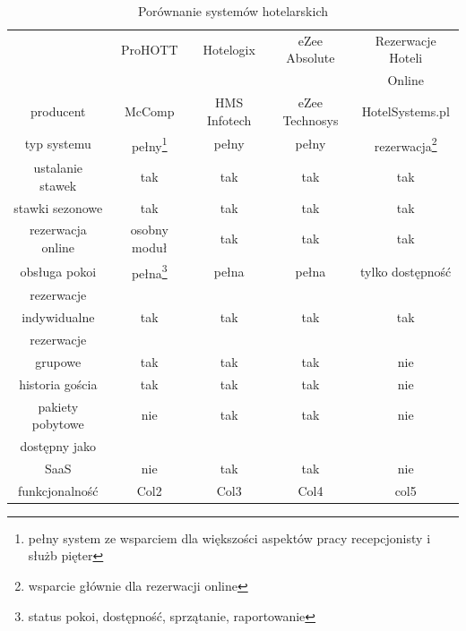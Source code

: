 \documentclass[a4paper,onecolumn,oneside,11pt,wide,floatssmall]{mwrep}
\theoremstyle{definition}
\theoremstyle{plain}%
\theoremstyle{remark}
\begin{document}
\begin{table}
\centering
\caption{Porównanie systemów hotelarskich}
\label{tab:systems}
\begin{minipage}{.9\textwidth}
\setlength{\baselineskip}{2mm}
\centering
\begin{tabular}{c|c|c|c|c}
                  & ProHOTT  & Hotelogix     & eZee Absolute       & Rezerwacje Hoteli \\
                  &&&&                                                         Online  \\ \hline
producent         & McComp   & HMS Infotech  & eZee Technosys      & HotelSystems.pl  \\ \hline
typ systemu       & pełny\footnote{pełny system ze wsparciem dla większości aspektów pracy recepcjonisty i służb pięter}    &  pełny        & pełny               & rezerwacja\footnote{wsparcie głównie dla rezerwacji online}       \\ \hline
ustalanie stawek  & tak      &  tak          & tak                 & tak              \\ \hline
stawki sezonowe   & tak      &  tak          & tak                 & tak              \\ \hline
rezerwacja online & osobny moduł & tak       & tak                 & tak              \\ \hline
obsługa pokoi     & pełna\footnote{status pokoi, dostępność, sprzątanie, raportowanie}    & pełna       & pełna               & tylko dostępność \\ \hline

rezerwacje  &&&&\\
indywidualne      & tak      & tak           & tak                 & tak              \\ \hline
rezerwacje &&&&\\
grupowe           & tak      & tak           & tak                 & nie              \\ \hline
historia gościa   & tak      & tak           & tak                 & nie              \\ \hline  
pakiety pobytowe  & nie      & tak           & tak                 & nie              \\ \hline  
dostępny jako &&&&\\   
SaaS              & nie      & tak           & tak                 & nie              \\ \hline

funkcjonalność    & Col2     & Col3          & Col4                & col5             \\ \hline

\end{tabular}
\end{minipage}
\end{table}
\end{document}

